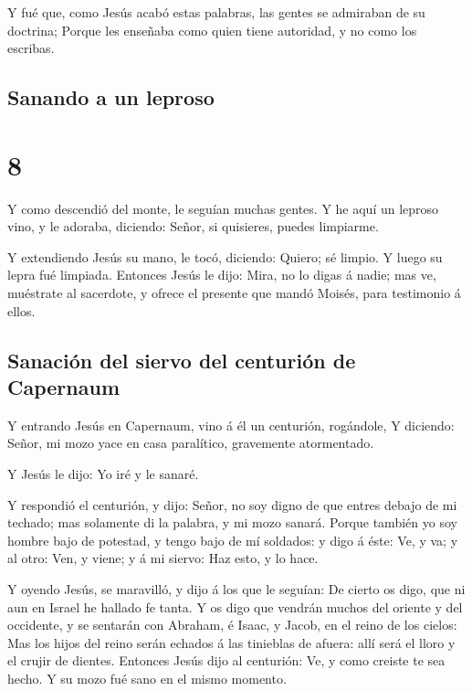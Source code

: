  Y fué que, como Jesús acabó estas palabras, las gentes se
admiraban de su doctrina;  Porque les enseñaba como quien
tiene autoridad, y no como los escribas.

\hypertarget{sanando-a-un-leproso}{%
\subsection{Sanando a un leproso}\label{sanando-a-un-leproso}}

\hypertarget{section-7}{%
\section{8}\label{section-7}}

 Y como descendió del monte, le seguían muchas gentes.
 Y he aquí un leproso vino, y le adoraba, diciendo: Señor,
si quisieres, puedes limpiarme.

 Y extendiendo Jesús su mano, le tocó, diciendo: Quiero; sé
limpio. Y luego su lepra fué limpiada.  Entonces Jesús le
dijo: Mira, no lo digas á nadie; mas ve, muéstrate al sacerdote, y
ofrece el presente que mandó Moisés, para testimonio á ellos.

\hypertarget{sanaciuxf3n-del-siervo-del-centuriuxf3n-de-capernaum}{%
\subsection{Sanación del siervo del centurión de
Capernaum}\label{sanaciuxf3n-del-siervo-del-centuriuxf3n-de-capernaum}}

 Y entrando Jesús en Capernaum, vino á él un centurión,
rogándole,  Y diciendo: Señor, mi mozo yace en casa
paralítico, gravemente atormentado.

 Y Jesús le dijo: Yo iré y le sanaré.

 Y respondió el centurión, y dijo: Señor, no soy digno de
que entres debajo de mi techado; mas solamente di la palabra, y mi mozo
sanará.  Porque también yo soy hombre bajo de potestad, y
tengo bajo de mí soldados: y digo á éste: Ve, y va; y al otro: Ven, y
viene; y á mi siervo: Haz esto, y lo hace.

 Y oyendo Jesús, se maravilló, y dijo á los que le seguían:
De cierto os digo, que ni aun en Israel he hallado fe tanta.
 Y os digo que vendrán muchos del oriente y del occidente,
y se sentarán con Abraham, é Isaac, y Jacob, en el reino de los cielos:
 Mas los hijos del reino serán echados á las tinieblas de
afuera: allí será el lloro y el crujir de dientes. 
Entonces Jesús dijo al centurión: Ve, y como creiste te sea hecho. Y su
mozo fué sano en el mismo momento.

